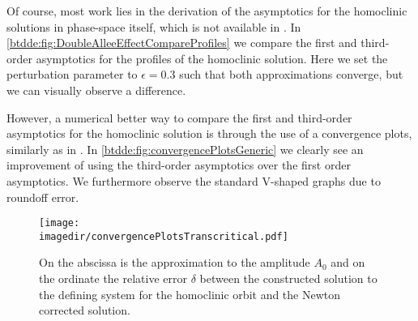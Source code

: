Of course, most work lies in the derivation of the asymptotics for the
homoclinic solutions in phase-space itself, which is not available in
\cite{Jiao2021}. In  \cref{btdde:fig:DoubleAlleeEffectCompareProfiles} we compare the
first and third-order asymptotics for the profiles of the homoclinic solution.
Here we set the perturbation parameter to $\epsilon=0.3$ such that both
approximations converge, but we can visually observe a difference.

However, a numerical better way to compare the first and third-order
asymptotics for the homoclinic solution is through the use of a convergence
plots, similarly as in \cite{Bosschaert@Interplay}. In
\cref{btdde:fig:convergencePlotsGeneric} we clearly see an improvement of using the
third-order asymptotics over the first order asymptotics. We furthermore
observe the standard V-shaped graphs due to roundoff error.
\begin{figure}[ht]
    \texttt{[image: \\imagedir/convergencePlotsTranscritical.pdf]}
    \caption{On the abscissa is the approximation to the amplitude $A_0$ and on
        the ordinate the relative error $\delta$ between the constructed solution
        to the defining system for the homoclinic orbit
        and the Newton corrected solution.}
    \label{btdde:fig:convergencePlotsTranscritical}
\end{figure}

